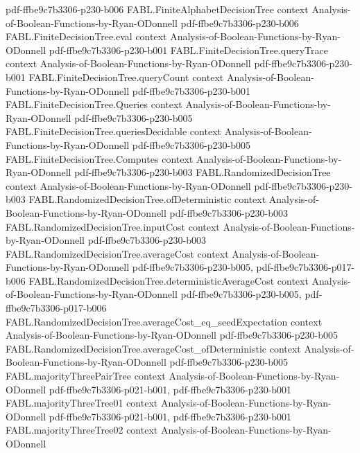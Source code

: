 \begin{theorem}
{    pdf-ffbe9c7b3306-p230-b006}
\proofstep
  {FABL.FiniteAlphabetDecisionTree}
  {context}
  {Analysis-of-Boolean-Functions-by-Ryan-ODonnell}
  {pdf-ffbe9c7b3306-p230-b006}
\proofstep
  {FABL.FiniteDecisionTree.eval}
  {context}
  {Analysis-of-Boolean-Functions-by-Ryan-ODonnell}
  {pdf-ffbe9c7b3306-p230-b001}
\proofstep
  {FABL.FiniteDecisionTree.queryTrace}
  {context}
  {Analysis-of-Boolean-Functions-by-Ryan-ODonnell}
  {pdf-ffbe9c7b3306-p230-b001}
\proofstep
  {FABL.FiniteDecisionTree.queryCount}
  {context}
  {Analysis-of-Boolean-Functions-by-Ryan-ODonnell}
  {pdf-ffbe9c7b3306-p230-b001}
\proofstep
  {FABL.FiniteDecisionTree.Queries}
  {context}
  {Analysis-of-Boolean-Functions-by-Ryan-ODonnell}
  {pdf-ffbe9c7b3306-p230-b005}
\proofstep
  {FABL.FiniteDecisionTree.queriesDecidable}
  {context}
  {Analysis-of-Boolean-Functions-by-Ryan-ODonnell}
  {pdf-ffbe9c7b3306-p230-b005}
\proofstep
  {FABL.FiniteDecisionTree.Computes}
  {context}
  {Analysis-of-Boolean-Functions-by-Ryan-ODonnell}
  {pdf-ffbe9c7b3306-p230-b003}
\proofstep
  {FABL.RandomizedDecisionTree}
  {context}
  {Analysis-of-Boolean-Functions-by-Ryan-ODonnell}
  {pdf-ffbe9c7b3306-p230-b003}
\proofstep
  {FABL.RandomizedDecisionTree.ofDeterministic}
  {context}
  {Analysis-of-Boolean-Functions-by-Ryan-ODonnell}
  {pdf-ffbe9c7b3306-p230-b003}
\proofstep
  {FABL.RandomizedDecisionTree.inputCost}
  {context}
  {Analysis-of-Boolean-Functions-by-Ryan-ODonnell}
  {pdf-ffbe9c7b3306-p230-b003}
\proofstep
  {FABL.RandomizedDecisionTree.averageCost}
  {context}
  {Analysis-of-Boolean-Functions-by-Ryan-ODonnell}
  {pdf-ffbe9c7b3306-p230-b005,
    pdf-ffbe9c7b3306-p017-b006}
\proofstep
  {FABL.RandomizedDecisionTree.deterministicAverageCost}
  {context}
  {Analysis-of-Boolean-Functions-by-Ryan-ODonnell}
  {pdf-ffbe9c7b3306-p230-b005,
    pdf-ffbe9c7b3306-p017-b006}
\proofstep
  {FABL.RandomizedDecisionTree.averageCost_eq_seedExpectation}
  {context}
  {Analysis-of-Boolean-Functions-by-Ryan-ODonnell}
  {pdf-ffbe9c7b3306-p230-b005}
\proofstep
  {FABL.RandomizedDecisionTree.averageCost_ofDeterministic}
  {context}
  {Analysis-of-Boolean-Functions-by-Ryan-ODonnell}
  {pdf-ffbe9c7b3306-p230-b005}
\proofstep
  {FABL.majorityThreePairTree}
  {context}
  {Analysis-of-Boolean-Functions-by-Ryan-ODonnell}
  {pdf-ffbe9c7b3306-p021-b001,
    pdf-ffbe9c7b3306-p230-b001}
\proofstep
  {FABL.majorityThreeTree01}
  {context}
  {Analysis-of-Boolean-Functions-by-Ryan-ODonnell}
  {pdf-ffbe9c7b3306-p021-b001,
    pdf-ffbe9c7b3306-p230-b001}
\proofstep
  {FABL.majorityThreeTree02}
  {context}
  {Analysis-of-Boolean-Functions-by-Ryan-ODonnell}

\end{theorem}

